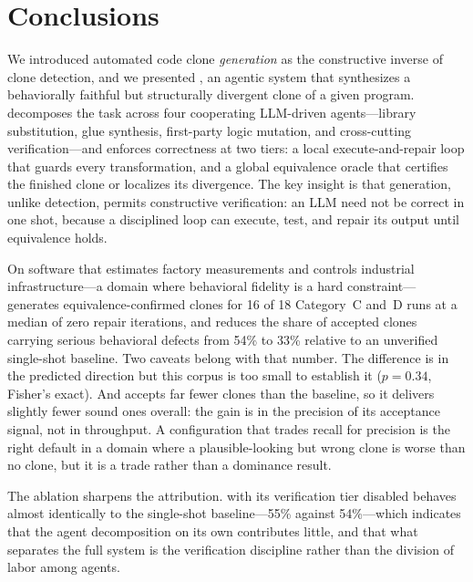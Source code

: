 \section{Conclusions}
\label{sec:conclusions}

We introduced automated code clone \emph{generation} as the constructive inverse of clone detection, and we presented \sys, an agentic system that synthesizes a behaviorally faithful but structurally divergent clone of a given program. \sys decomposes the task across four cooperating LLM-driven agents---library substitution, glue synthesis, first-party logic mutation, and cross-cutting verification---and enforces correctness at two tiers: a local execute-and-repair loop that guards every transformation, and a global equivalence oracle that certifies the finished clone or localizes its divergence. The key insight is that generation, unlike detection, permits constructive verification: an LLM need not be correct in one shot, because a disciplined loop can execute, test, and repair its output until equivalence holds.

On software that estimates factory measurements and controls industrial infrastructure---a domain where behavioral fidelity is a hard constraint---\sys generates equivalence-confirmed clones for 16 of 18 Category~C and~D runs at a median of zero repair iterations, and reduces the share of accepted clones carrying serious behavioral defects from 54\% to 33\% relative to an unverified single-shot baseline. Two caveats belong with that number. The difference is in the predicted direction but this corpus is too small to establish it ($p=0.34$, Fisher's exact). And \sys accepts far fewer clones than the baseline, so it delivers slightly fewer sound ones overall: the gain is in the precision of its acceptance signal, not in throughput. A configuration that trades recall for precision is the right default in a domain where a plausible-looking but wrong clone is worse than no clone, but it is a trade rather than a dominance result.

The ablation sharpens the attribution. \sys with its verification tier disabled behaves almost identically to the single-shot baseline---55\% against 54\%---which indicates that the agent decomposition on its own contributes little, and that what separates the full system is the verification discipline rather than the division of labor among agents.

